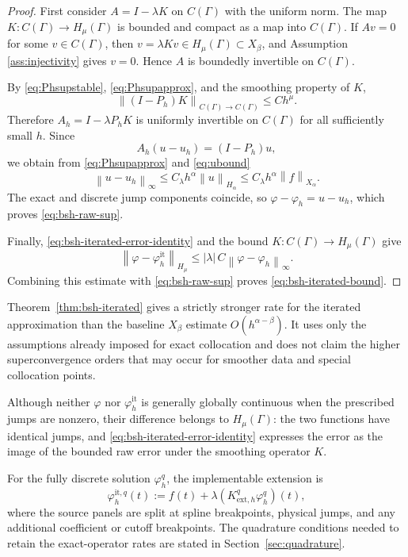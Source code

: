 \documentclass[11pt,a4paper]{amsart}
\theoremstyle{plain}
\theoremstyle{definition}
\theoremstyle{remark}
\newcommand{\Ga}{\Gamma}
\newcommand{\norm}[1]{\left\|#1\right\|}
\begin{document}
\begin{proof}
First consider $A=I-\lambda K$ on $C(\Ga)$ with the uniform norm.
The map $K:C(\Ga)\to H_\mu(\Ga)$ is bounded and compact as a map into
$C(\Ga)$.  If $Av=0$ for some $v\in C(\Ga)$, then
$v=\lambda Kv\in H_\mu(\Ga)\subset X_\beta$, and Assumption
\ref{ass:injectivity} gives $v=0$.  Hence $A$ is boundedly invertible on
$C(\Ga)$.

By \eqref{eq:Phsupstable}, \eqref{eq:Phsupapprox}, and the smoothing property
of $K$,
\[
        \norm{(I-P_h)K}_{C(\Ga)\to C(\Ga)}
        \le Ch^\mu.
\]
Therefore $A_h=I-\lambda P_hK$ is uniformly invertible on $C(\Ga)$ for all
sufficiently small $h$.  Since
\[
        A_h(u-u_h)=(I-P_h)u,
\]
we obtain from \eqref{eq:Phsupapprox} and \eqref{eq:ubound}
\[
        \norm{u-u_h}_{\infty}
        \le
        C_\lambda h^\alpha\norm{u}_{H_\alpha}
        \le
        C_\lambda h^\alpha\norm{f}_{X_\alpha}.
\]
The exact and discrete jump components coincide, so
$\varphi-\varphi_h=u-u_h$, which proves \eqref{eq:bsh-raw-sup}.

Finally, \eqref{eq:bsh-iterated-error-identity} and the bound
$K:C(\Ga)\to H_\mu(\Ga)$ give
\[
        \norm{\varphi-\varphi_h^{\mathrm{it}}}_{H_\mu}
        \le
        |\lambda|\,C\norm{\varphi-\varphi_h}_{\infty}.
\]
Combining this estimate with \eqref{eq:bsh-raw-sup} proves
\eqref{eq:bsh-iterated-bound}.
\end{proof}

Theorem~\ref{thm:bsh-iterated} gives a strictly stronger rate for the
iterated approximation than the baseline $X_\beta$ estimate
$O(h^{\alpha-\beta})$.  It uses only the assumptions already imposed for
exact collocation and does not claim the higher superconvergence orders that
may occur for smoother data and special collocation points.

Although neither $\varphi$ nor $\varphi_h^{\mathrm{it}}$ is generally globally continuous when the prescribed jumps are nonzero, their difference belongs to $H_\mu(\Ga)$: the two functions have identical jumps, and \eqref{eq:bsh-iterated-error-identity} expresses the error as the image of the bounded raw error under the smoothing operator $K$.

For the fully discrete solution $\varphi_h^q$, the implementable extension is
\begin{equation}\label{eq:bsh-iterated-discrete}
        \varphi_h^{\mathrm{it},q}(t)
        :=f(t)+\lambda
        (K_{\mathrm{ext},h}^q\varphi_h^q)(t),
\end{equation}
where the source panels are split at spline breakpoints, physical jumps, and
any additional coefficient or cutoff breakpoints.  The quadrature conditions
needed to retain the exact-operator rates are stated in
Section~\ref{sec:quadrature}.
\end{document}
